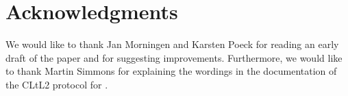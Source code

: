 \section{Acknowledgments}

We would like to thank Jan Morningen and Karsten Poeck for reading an
early draft of the paper and for suggesting improvements.
Furthermore, we would like to thank Martin Simmons for explaining the
wordings in the documentation of the CLtL2 protocol for \lispworks{}.
